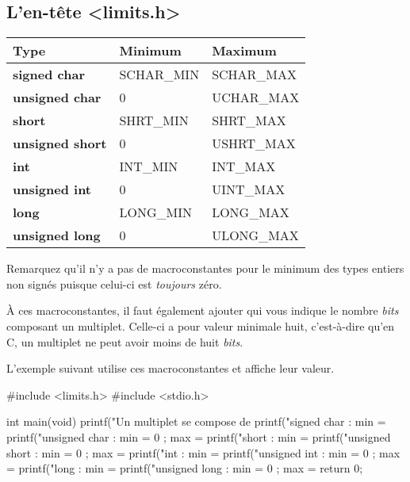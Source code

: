 \subsection{L'en-tête \textless{}limits.h\textgreater{}}
\label{len-tete-limits.h}

\begin{table}
\centering
{}
\begin{tabular}{|l|l|l|}\hline
\rowcolor{gris-tab-entete}\bf 
Type & Minimum & Maximum\tabularnewline\hline
\textbf{signed char} & SCHAR\_MIN & SCHAR\_MAX\tabularnewline\hline
\textbf{unsigned char} & 0 & UCHAR\_MAX\tabularnewline\hline
\textbf{short} & SHRT\_MIN & SHRT\_MAX\tabularnewline\hline
\textbf{unsigned short} & 0 & USHRT\_MAX\tabularnewline\hline
\textbf{int} & INT\_MIN & INT\_MAX\tabularnewline\hline
\textbf{unsigned int} & 0 & UINT\_MAX\tabularnewline\hline
\textbf{long} & LONG\_MIN & LONG\_MAX\tabularnewline\hline
\textbf{unsigned long} & 0 & ULONG\_MAX\tabularnewline\hline
\end{tabular}
\end{table}

\begin{infobox}
Remarquez qu'il n'y a pas de macroconstantes pour le minimum des 
types entiers non signés puisque celui-ci est \emph{toujours} zéro.
\end{infobox}


À ces macroconstantes, il faut également ajouter  qui
vous indique le nombre \emph{bits} composant un multiplet. Celle-ci a
pour valeur minimale huit, c'est-à-dire qu'en C, un multiplet ne peut
avoir moins de huit \emph{bits}.

L'exemple suivant utilise ces macroconstantes et affiche leur valeur.

\begin{C}
#include <limits.h>
#include <stdio.h>


int
main(void)
{
    printf("Un multiplet se compose de %
    printf("signed char : min = %
    printf("unsigned char : min = 0 ; max = %
    printf("short : min = %
    printf("unsigned short : min = 0 ; max = %
    printf("int : min = %
    printf("unsigned int : min = 0 ; max = %
    printf("long : min = %
    printf("unsigned long : min = 0 ; max = %
    return 0;
}
\end{C}

